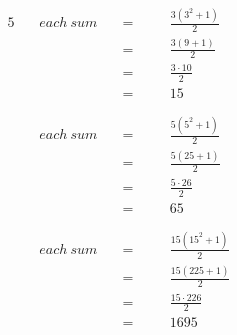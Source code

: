 \begin{alignat*}{5}
&\,&each~sum\quad&=\quad&&\frac{3(3^2+1)}{2}\\
&\,&\,&=&&\frac{3(9+1)}{2}\\
&\,&\,&=&&\frac{3\cdot10}{2}\\
&\,&\,&=&&15\\
\\ \\
&\,&each~sum\quad&=&&\frac{5(5^2+1)}{2}\\
&\,&\,&=&&\frac{5(25+1)}{2}\\
&\,&\,&=&&\frac{5\cdot26}{2}\\
&\,&\,&=&&65\\
\\ \\
&\,&each~sum\quad&=&&\frac{15(15^2+1)}{2}\\
&\,&\,&=&&\frac{15(225+1)}{2}\\
&\,&\,&=&&\frac{15\cdot226}{2}\\
&\,&\,&=&&1695
\end{alignat*}
